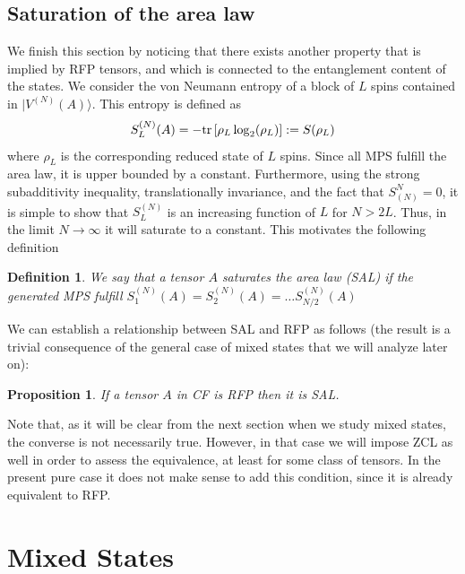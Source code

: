 \documentclass{elsarticle}
\newcommand{\be}{\begin{equation}}
\newcommand{\ee}{\end{equation}}
\newtheorem{prop}[thm]{Proposition}
\newtheorem{defn}[thm]{Definition}
\begin{document}
\subsection{Saturation of the area law}

We finish this section by noticing that there exists another property that is implied by RFP tensors, and which is connected to the entanglement content of the states. We consider the von Neumann entropy of a block of $L$ spins contained in $|V^{(N)}(A)\rangle$. This entropy is defined as
\be
    S_L^{(N)}(A) = - {\rm tr}\left[\rho_L \log_2(\rho_L)\right]:= S(\rho_L)
\ee
where $\rho_L$ is the corresponding reduced state of $L$ spins. Since all MPS fulfill the area law, it is upper bounded by a constant. Furthermore, using the strong subadditivity inequality, translationally invariance, and the fact that $S_{(N)}^N=0$, it is simple to show that $S_L^{(N)}$ is an increasing function of $L$ for $N>2L$. Thus, in the limit $N\to \infty$ it will saturate to a constant. This motivates the following definition
\begin{defn}
    We say that a tensor $A$ {\em saturates the area law} (SAL) if the generated MPS fulfill $S_1^{(N)}(A)=S_2^{(N)}(A)=\ldots S_{N/2}^{(N)}(A)$
\end{defn}

We can establish a relationship between SAL and RFP as follows (the result is a trivial consequence of the general case of mixed states that we will analyze later on):

\begin{prop}
    \label{ZCLandSALpure}
    If a tensor $A$ in CF is RFP then it is SAL.
\end{prop}

Note that, as it will be clear from the next section when we study mixed states, the converse is not necessarily true. However, in that case we will impose ZCL as well in order to assess the equivalence, at least for some class of tensors. In the present pure case it does not make sense to add this condition, since it is already equivalent to RFP.


\section{Mixed States}\label{Sec:mixed-states}
\end{document}
